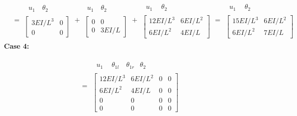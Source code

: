 \begin{example}
\begin{fig}
  
\end{fig}
{\small
\begin{align*}
  [k] &= \begin{array}{c}\begin{array}{cc}\ u_1\ & \theta_2\end{array}\\ \left[\begin{array}{cc}3EI/L^3 & 0\\ 0 & 0\end{array}\right]\end{array}
  + \begin{array}{c}\begin{array}{cc}u_1 & \ \theta_2\ \end{array}\\ \left[\begin{array}{cc}0 & 0\\ 0 & 3EI/L\end{array}\right]\end{array}
  + \begin{array}{c}\begin{array}{cc}\ u_1\ & \ \theta_2\ \end{array}\\ \left[\begin{array}{cc}12EI/L^3 & 6EI/L^2\\ 6EI/L^2 & 4EI/L\end{array}\right]\end{array}
  = \begin{array}{c}\begin{array}{cc}\ u_1\ & \ \theta_2\ \end{array}\\ \left[\begin{array}{cc}15EI/L^3 & 6EI/L^2\\ 6EI/L^2 & 7EI/L\end{array}\right]\end{array}
\end{align*}}
\textbf{Case 4:}
\begin{fig}
  
\end{fig}
{\footnotesize\setlength{\arraycolsep}{3pt}
\begin{align*}
  [k] &= \begin{array}{c}\begin{array}{cccc}\ u_1\ & \ \theta_{1l}\ & \theta_{1r} & \theta_2\end{array}\\ \left[\begin{array}{cccc}12EI/L^3 & 6EI/L^2 & 0 & 0\\ 6EI/L^2 & 4EI/L & 0 & 0\\ 0 & 0 & 0 & 0\\ 0 & 0 & 0 & 0\end{array}\right]\end{array}

\end{align*}}
\end{example}
